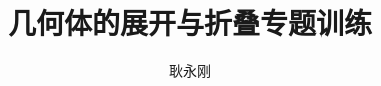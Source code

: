 \documentclass[final]{tiku}
\title{几何体的展开与折叠专题训练}
\author{耿永刚}
\begin{document}
\begin{enumerate}
\foreachproblem{%
\item%
\label{prob:\thisproblemlabel}
\thisproblem%
}
\end{enumerate}
\end{document}

